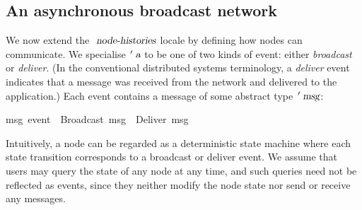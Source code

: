 \subsection{An asynchronous broadcast network}\label{sect.network.broadcast}

We now extend the $\isa{node-histories}$ locale by defining how nodes can communicate.
We specialise $\isacharprime\isa{a}$ to be one of two kinds of event: either \emph{broadcast} or \emph{deliver}.
(In the conventional distributed systems terminology, a \emph{deliver} event indicates that a message was received from the network and delivered to the application.)
Each event contains a message of some abstract type $\isacharprime\isa{msg}$:
\begin{isabelle}
 {\isacharprime}msg\ event\ {\isacharequal}\ Broadcast\ {\isacharprime}msg\ {\isacharbar}\ Deliver\ {\isacharprime}msg
\end{isabelle}
Intuitively, a node can be regarded as a deterministic state machine where each state transition corresponds to a broadcast or deliver event.
We assume that users may query the state of any node at any time, and such queries need not be reflected as events, since they neither modify the node state nor send or receive any messages.

